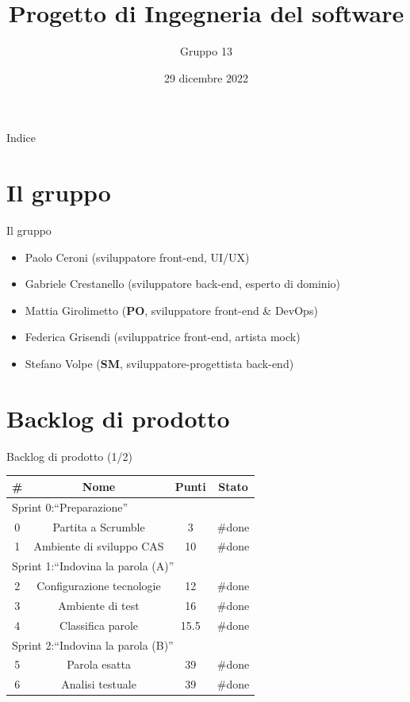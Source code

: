 \documentclass{beamer}
\title{Progetto di Ingegneria del software}
\author{Gruppo 13}
\institute{Universit\`a di Bologna}
\date{29 dicembre 2022}
\begin{document}
\begin{frame}
	\titlepage
\end{frame}

\begin{frame}{Indice}
	\tableofcontents
\end{frame}

\section{Il gruppo}
\begin{frame}{Il gruppo}
	\begin{itemize}
		\item Paolo Ceroni (sviluppatore front-end, UI/UX)
		\item Gabriele Crestanello (sviluppatore back-end, esperto di dominio)
		\item Mattia Girolimetto (\textbf{PO}, sviluppatore front-end \& DevOps)
		\item Federica Grisendi (sviluppatrice front-end, artista mock)
		\item Stefano Volpe (\textbf{SM}, sviluppatore-progettista back-end)
	\end{itemize}
\end{frame}

\section{Backlog di prodotto}
\begin{frame}{Backlog di prodotto (1/2)}
	\begin{table}
		\begin{tabular}{|c|c|c|c|}
			\hline
			\textbf{\#} & \textbf{Nome}             & \textbf{Punti} & \textbf{Stato} \\
			\hline
			\multicolumn{4}{|l|}{Sprint 0:``Preparazione''}                           \\
			\hline
			0           & Partita a Scrumble        & 3              & \#done         \\
			\hline
			1           & Ambiente di sviluppo CAS  & 10             & \#done         \\
			\hline
			\multicolumn{4}{|l|}{Sprint 1:``Indovina la parola (A)''}                 \\
			\hline
			2           & Configurazione tecnologie & 12             & \#done         \\
			\hline
			3           & Ambiente di test          & 16             & \#done         \\
			\hline
			4           & Classifica parole         & 15.5           & \#done         \\
			\hline
			\multicolumn{4}{|l|}{Sprint 2:``Indovina la parola (B)''}                 \\
			\hline
			5           & Parola esatta             & 39             & \#done         \\
			\hline
			6           & Analisi testuale          & 39             & \#done         \\
			\hline
		\end{tabular}
	\end{table}
\end{frame}
\end{document}
